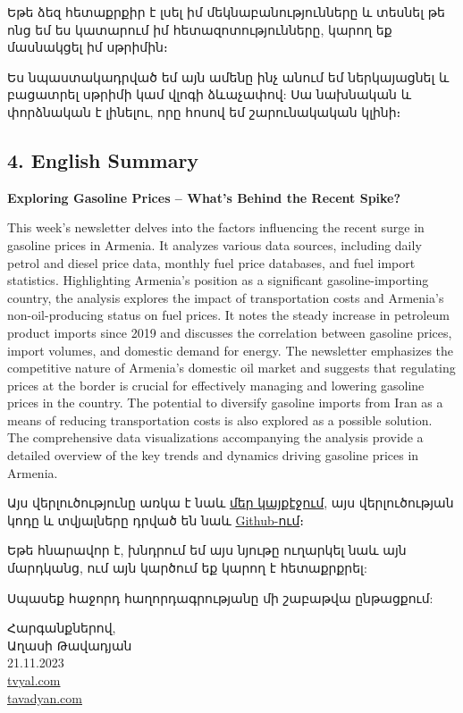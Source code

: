 \documentclass[
]{article}
\begin{document}
Եթե ձեզ հետաքրքիր է լսել իմ մեկնաբանությունները և տեսնել թե ոնց եմ ես
կատարում իմ հետազոտությունները, կարող եք մասնակցել իմ սթրիմին։

\href{https://www.facebook.com/events/1125123785538008/}{}

Ես նպաստակադրված եմ այն ամենը ինչ անում եմ ներկայացնել և բացատրել սթրիմի
կամ վլոգի ձևաչափով: Սա նախնական և փորձնական է լինելու, որը հոսով եմ
շարունակական կլինի։

\hypertarget{english-summary}{%
\subsection{4. English Summary}\label{english-summary}}

\textbf{Exploring Gasoline Prices -- What's Behind the Recent Spike?}

This week's newsletter delves into the factors influencing the recent
surge in gasoline prices in Armenia. It analyzes various data sources,
including daily petrol and diesel price data, monthly fuel price
databases, and fuel import statistics. Highlighting Armenia's position
as a significant gasoline-importing country, the analysis explores the
impact of transportation costs and Armenia's non-oil-producing status on
fuel prices. It notes the steady increase in petroleum product imports
since 2019 and discusses the correlation between gasoline prices, import
volumes, and domestic demand for energy. The newsletter emphasizes the
competitive nature of Armenia's domestic oil market and suggests that
regulating prices at the border is crucial for effectively managing and
lowering gasoline prices in the country. The potential to diversify
gasoline imports from Iran as a means of reducing transportation costs
is also explored as a possible solution. The comprehensive data
visualizations accompanying the analysis provide a detailed overview of
the key trends and dynamics driving gasoline prices in Armenia.

Այս վերլուծությունը առկա է նաև
\href{https://www.tvyal.com/newsletter/2023_11_20}{մեր կայքէջում}, այս
վերլուծության կոդը և տվյալները դրված են նաև
\href{https://github.com/tavad/tvyal_newsletter}{Github-ում}։

Եթե հնարավոր է, խնդրում եմ այս նյութը ուղարկել նաև այն մարդկանց, ում այն
կարծում եք կարող է հետաքրքրել:

Սպասեք հաջորդ հաղորդագրությանը մի շաբաթվա ընթացքում:

Հարգանքներով,\\
Աղասի Թավադյան\\
21.11.2023\\
\href{https://www.tvyal.com/}{tvyal.com}\\
\href{https://www.tavadyan.com/}{tavadyan.com}
\end{document}
